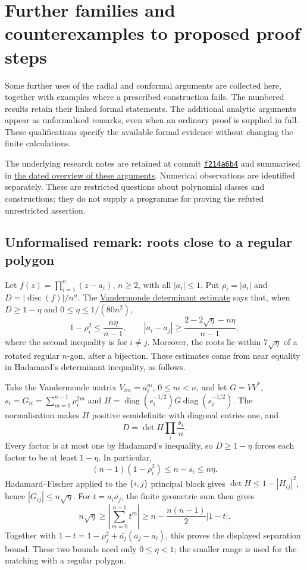 \section{Further families and counterexamples to proposed proof steps}
\label{sec:frontier}

Some further uses of the radial and conformal arguments are collected
here, together with examples where a prescribed construction fails.
The numbered results retain their linked formal statements. The
additional analytic arguments appear as unformalised remarks, even
when an ordinary proof is supplied in full. These qualifications specify the available formal evidence without
changing the finite calculations.

The underlying research notes are retained at commit
\href{https://github.com/wcook04/plectis-erdos/tree/f214a6b45528dc5eefe20ffadc35f2e981627d4c/research_corpus/Erdos1041}{\texttt{f214a6b4}}
and summarised in \href{https://github.com/wcook04/plectis-erdos/blob/f214a6b45528dc5eefe20ffadc35f2e981627d4c/research_corpus/Erdos1041/FRONTIER.md}{the dated overview of these arguments}.
Numerical observations are identified separately. These are restricted
questions about polynomial classes and constructions; they do not
supply a programme for proving the refuted unrestricted assertion.

\subsection*{Unformalised remark: roots close to a regular polygon}

Let $f(z)=\prod_{i=1}^n(z-a_i)$, $n\ge2$, with all $|a_i|\le1$.
Put $\rho_i=|a_i|$ and $D=|\operatorname{disc}(f)|/n^n$.  The
\href{https://github.com/wcook04/plectis-erdos/blob/f214a6b45528dc5eefe20ffadc35f2e981627d4c/research_corpus/Erdos1041/NearFeketeRadialAngularSplit.md}{Vandermonde determinant estimate}
says that, when $D\ge1-\eta$ and
$0\le\eta\le1/(80n^2)$,
\[
  1-\rho_i^2\le \frac{n\eta}{n-1},\qquad
  |a_i-a_j|\ge \frac{2-2\sqrt\eta-n\eta}{n-1},
\]
where the second inequality is for $i\ne j$. Moreover, the roots lie
within $7\sqrt\eta$ of a rotated regular $n$-gon, after a bijection.
These estimates come from near equality in Hadamard's determinant
inequality, as follows.

Take the Vandermonde matrix $V_{im}=a_i^m$, $0\le m<n$, and let
$G=VV^*$, $s_i=G_{ii}=\sum_{m=0}^{n-1}\rho_i^{2m}$ and
$H=\operatorname{diag}(s_i^{-1/2})G\operatorname{diag}(s_i^{-1/2})$.
The normalisation makes $H$ positive semidefinite with diagonal entries
one, and
\[
 D=\det H\prod_i\frac{s_i}{n}.
\]
Every factor is at most one by Hadamard's inequality, so $D\ge1-\eta$
forces each factor to be at least $1-\eta$. In particular,
\[
 (n-1)(1-\rho_i^2)\le n-s_i\le n\eta.
\]
Hadamard--Fischer applied to the $\{i,j\}$ principal block gives
$\det H\le1-|H_{ij}|^2$, hence $|G_{ij}|\le n\sqrt\eta$.
For $t=a_i\overline{a_j}$, the finite geometric sum then gives
\[
 n\sqrt\eta\ge\left|\sum_{m=0}^{n-1}t^m\right|
 \ge n-\frac{n(n-1)}2|1-t|.
\]
Together with
$1-t=1-\rho_j^2+\overline{a_j}(a_j-a_i)$, this proves the displayed
separation bound. These two bounds need only $0\le\eta<1$;
the smaller range is used for the matching with a regular polygon.

